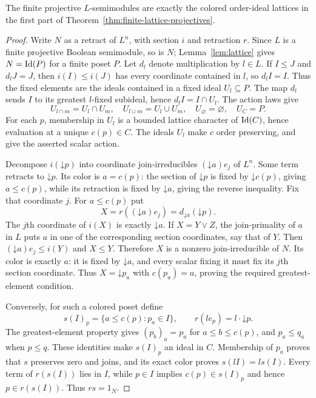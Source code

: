 \begin{lemma}\label{lem:lattice-support-projectives}
The finite projective $L$-semimodules are exactly the colored order-ideal
lattices in the first part of
Theorem~\ref{thm:finite-lattice-projectives}.
\end{lemma}
\begin{proof}
Write $N$ as a retract of $L^n$, with section $i$ and retraction $r$.
Since $L$ is a finite projective Boolean semimodule, so is $N$;
Lemma~\ref{lem:lattice} gives $N=\operatorname{Id}(P)$ for a finite poset $P$.
Let $d_l$ denote multiplication by $l\in L$. If $I\le J$ and
$d_lJ=J$, then $i(I)\le i(J)$ has every coordinate contained in $l$,
so $d_lI=I$. Thus the fixed elements are the ideals contained in a
fixed ideal $U_l\subseteq P$. The map $d_l$ sends $I$ to its greatest
$l$-fixed subideal, hence $d_lI=I\cap U_l$. The action laws give
\[
 U_{l\cap m}=U_l\cap U_m,\quad U_{l\cup m}=U_l\cup U_m,
 \quad U_\varnothing=\varnothing,\quad U_C=P.
\]
For each $p$, membership in $U_l$ is a bounded lattice character of
$\operatorname{Id}(C)$, hence evaluation at a unique $c(p)\in C$. The ideals $U_l$
make $c$ order preserving, and give the asserted scalar action.

Decompose $i(\mathord\downarrow p)$ into coordinate join-irreducibles
$(\mathord\downarrow a)e_j$ of $L^n$. Some term retracts to
$\mathord\downarrow p$. Its color is $a=c(p)$: the section of
$\mathord\downarrow p$ is fixed by $\mathord\downarrow c(p)$,
giving $a\le c(p)$, while its retraction is fixed by
$\mathord\downarrow a$, giving the reverse inequality. Fix that
coordinate $j$. For $a\le c(p)$ put
\[
 X=r((\mathord\downarrow a)e_j)
   =d_{\mathord\downarrow a}(\mathord\downarrow p).
\]
The $j$th coordinate of $i(X)$ is exactly $\mathord\downarrow a$.
If $X=Y\vee Z$, the join-primality of $a$ in $L$ puts $a$ in one
of the corresponding section coordinates, say that of $Y$.
Then $(\mathord\downarrow a)e_j\le i(Y)$ and $X\le Y$.
Therefore $X$ is a nonzero join-irreducible of $N$. Its color is exactly
$a$: it is fixed by $\mathord\downarrow a$, and every scalar fixing
it must fix its $j$th section coordinate. Thus $X=\mathord\downarrow p_a$
with $c(p_a)=a$, proving the required greatest-element condition.

Conversely, for such a colored poset define
\begin{equation}\label{eq:lattice-support-section}
 s(I)_p=\{a\le c(p):p_a\in I\},\qquad
 r(l e_p)=l\cdot\mathord\downarrow p.
\end{equation}
The greatest-element property gives $(p_b)_a=p_a$ for
$a\le b\le c(p)$, and $p_a\le q_a$ when $p\le q$.
These identities make $s(I)_p$ an ideal in $C$. Membership of $p_a$
proves that $s$ preserves zero and joins, and its exact color proves
$s(lI)=l s(I)$. Every term of $r(s(I))$ lies in $I$, while $p\in I$
implies $c(p)\in s(I)_p$ and hence $p\in r(s(I))$. Thus $rs=1_N$.
\end{proof}


